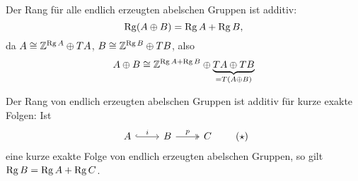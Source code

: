 \begin{bemerkung}[{name=[Der Rang ist additiv]},label=bem:47]
	Der Rang für alle endlich erzeugten abelschen Gruppen ist additiv:
	\[
		\operatorname{Rg}(A \oplus B) =\operatorname{Rg} A + \operatorname{Rg} B,
	\]
	da $A \cong \mathbb{Z}^{\operatorname{Rg} A} \oplus T A$, $B \cong \mathbb{Z}^{\operatorname{Rg} B} \oplus TB$, also 
	\[
		A \oplus B \cong \mathbb{Z}^{\operatorname{Rg} A + \operatorname{Rg} B} \oplus \underbrace{T A \oplus T B}_{=T(A \oplus B)}
	\]
\end{bemerkung}

\begin{proposition}[{name=[{Der Rang ist für kurze exakte Folgen endl. erz., abelscher Gruppen additiv}]},label=prop:48]
	Der Rang von endlich erzeugten abelschen Gruppen ist additiv für kurze exakte Folgen: Ist
	\begin{equation*}
		\begin{tikzcd}
			A \rar["i",hook] & B \rar["p", two heads] & C
		\end{tikzcd} \label{eq:48}\tag{$\star$}
	\end{equation*}
	eine kurze exakte Folge von endlich 
	erzeugten abelschen Gruppen, so gilt $\operatorname{Rg} B = \operatorname{Rg} A + \operatorname{Rg} C$.
\end{proposition}
